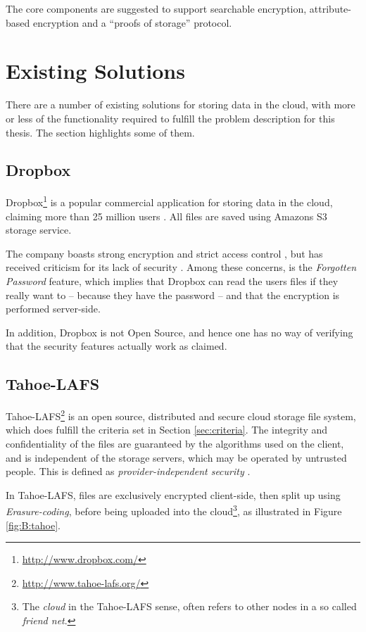\documentclass[pdftex,english,10pt,b5paper,twoside]{book}
\begin{document}
The core components are suggested to support searchable encryption,
attribute-based encryption and a ``proofs of storage'' protocol.

\section{Existing Solutions}
There are a number of existing solutions for storing data in the cloud,
with more or less of the functionality required to fulfill the problem
description for this thesis. The section highlights some of them.

\subsection{Dropbox}

Dropbox\footnote{\url{http://www.dropbox.com/}} is a popular commercial
application for storing data in the cloud, claiming more than 25 million users
\cite{dropbox_users}. All files are saved using Amazons S3 storage service.

The company boasts strong encryption and strict access control
\cite{dropbox_security}, but has received criticism for its lack of security
\cite{dropbox_concerns}. Among these concerns, is the \emph{Forgotten Password}
feature, which implies that Dropbox can read the users files if they really
want to -- because they have the password -- and that the encryption is
performed server-side.

In addition, Dropbox is not Open Source, and hence one has no way of verifying
that the security features actually work as claimed.

\subsection{Tahoe-LAFS}

Tahoe-\ac{LAFS}\footnote{\url{http://www.tahoe-lafs.org/}} is an open source,
distributed and secure cloud storage file system, which does fulfill
the criteria set in Section \ref{sec:criteria}. 
The integrity and confidentiality of the
files are guaranteed by the algorithms used on the client, and is independent
of the storage servers, which may be operated by untrusted people.
This is defined as \emph{provider-independent security} \cite{tahoe}.

In Tahoe-\ac{LAFS}, files are exclusively encrypted client-side, then split up
using \emph{Erasure-coding}, before being uploaded into the cloud\footnote{The
\emph{cloud} in the Tahoe-\ac{LAFS} sense, often refers to other nodes in a so
called \emph{friend net}.}, as illustrated in Figure \ref{fig:B:tahoe}.
\end{document}
